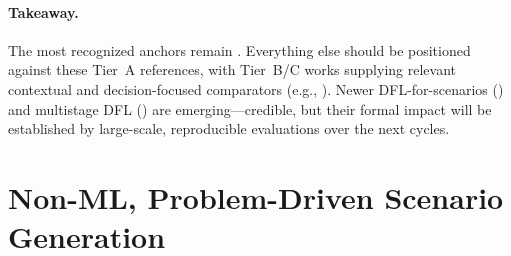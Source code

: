 \documentclass[11pt]{article}
\begin{document}
\paragraph{Takeaway.} The most recognized anchors remain \citet{elmachtoub2021spo,bertsimas2020predictive,ban2019bigdata,donti2017task}. Everything else should be positioned against these Tier~A references, with Tier~B/C works supplying relevant contextual and decision-focused comparators (e.g., \citet{kallus2023sof,munoz2022bilevel,deng2022predictive}). Newer DFL-for-scenarios (\citet{islip2025contextual,wu2022cvae}) and multistage DFL (\citet{persak2024dff}) are emerging—credible, but their formal impact will be established by large-scale, reproducible evaluations over the next cycles.

\section*{Non-ML, Problem-Driven Scenario Generation}
\end{document}
